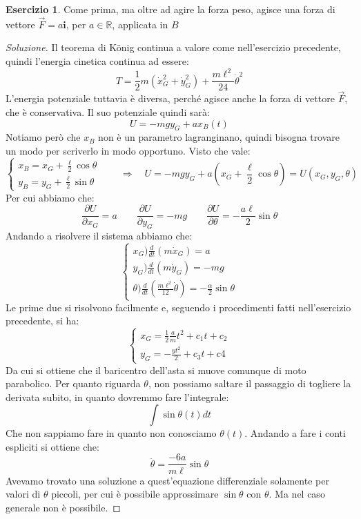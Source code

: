 \documentclass[11pt,a4paper,twoside]{article}
\theoremstyle{definition}
\newtheorem{ese}{Esercizio}[section]
\newenvironment{sol}
	{\renewcommand\qedsymbol{$\blacksquare$}\begin{proof}[Soluzione]}
	{\end{proof}}
\begin{document}
\begin{ese}
	Come prima, ma oltre ad agire la forza peso, agisce una forza di vettore $\vec F = a \mathbf i$, per $a \in \mathbb R$, applicata in $B$
\end{ese}
\begin{sol}
	Il teorema di König continua a valore come nell'esercizio precedente, quindi l'energia cinetica continua ad essere:
	\[ T =\frac 12 m \left( \dot x_G^2 + \dot y_G^2 \right) + \frac{m\ell^2}{24} \dot \theta^2 \]
	L'energia potenziale tuttavia è diversa, perché agisce anche la forza di vettore $\vec F$, che è conservativa. Il suo potenziale quindi sarà:
	\[ U = -mgy_G + ax_B(t) \]
	Notiamo però che $x_B$ non è un parametro lagranginano, quindi bisogna trovare un modo per scriverlo in modo opportuno. Visto che vale:
	\[ \begin{cases}
		x_B = x_G + \frac \ell 2 \cos \theta\\
		y_B = y_G + \frac \ell 2 \sin \theta
	\end{cases}\qquad \Rightarrow \quad U =-mgy_G + a\left(x_G + \frac \ell 2 \cos \theta \right)= U(x_G, y_G, \theta) \]
	Per cui abbiamo che:
	\[ \frac{\partial U}{\partial x_G} = a \qquad \frac{\partial U}{\partial y_G} = -mg \qquad \frac{\partial U}{\partial \theta} = -\frac{a\ell}2 \sin \theta \]
	Andando a risolvere il sistema abbiamo che:
	\[
		\begin{cases}
			x_G) \frac{d}{dt}(m\dot x_G) = a\\
			y_G) \frac{d}{dt}(m\dot y_G) = -mg\\
			\theta) \frac{d}{dt} \left( \frac{m\ell^2}{12}\dot \theta \right) = -\frac \alpha 2 \sin \theta
		\end{cases}
	\]
	Le prime due si risolvono facilmente e, seguendo i procedimenti fatti nell'esercizio precedente, si ha:
	\[\begin{cases}
		x_G = \frac 12 \frac am t^2 + c_1t + c_2\\
		y_G = -\frac{yt^2}2 + c_3t + c4
	\end{cases}\]
	Da cui si ottiene che il baricentro dell'asta si muove comunque di moto parabolico. Per quanto riguarda $\theta$, non possiamo saltare il passaggio di togliere la derivata subito, in quanto dovremmo fare l'integrale:
	\[ \int \sin \theta (t) dt \]
	Che non sappiamo fare in quanto non conosciamo $\theta(t)$. Andando a fare i conti espliciti si ottiene che:
	\[ \ddot \theta = \frac{-6a}{m\ell} \sin \theta \]
	Avevamo trovato una soluzione a quest'equazione differenziale solamente per valori di $\theta$ piccoli, per cui è possibile approssimare $\sin \theta$ con $\theta$. Ma nel caso generale non è possibile.
\end{sol}
\end{document}
